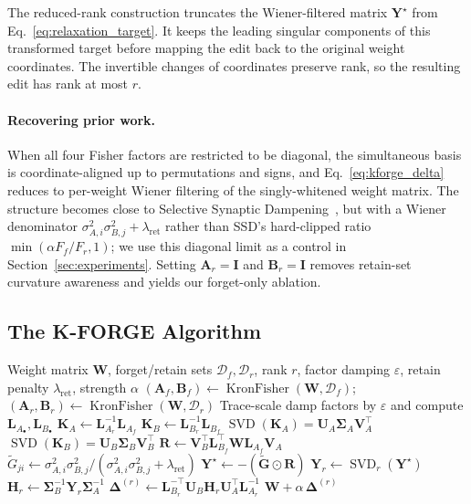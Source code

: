 \documentclass[11pt]{article}
\begin{document}
The reduced-rank construction truncates the Wiener-filtered matrix $\mathbf{Y}^{\star}$ from Eq.~\ref{eq:relaxation_target}.
It keeps the leading singular components of this transformed target before mapping the edit back to the original weight coordinates.
The invertible changes of coordinates preserve rank, so the resulting edit has rank at most $r$.


\paragraph{Recovering prior work.}
When all four Fisher factors are restricted to be diagonal, the simultaneous basis is coordinate-aligned up to permutations and signs, and Eq.~\ref{eq:kforge_delta} reduces to per-weight Wiener filtering of the singly-whitened weight matrix. The structure becomes close to Selective Synaptic Dampening~\citep{foster24}, but with a Wiener denominator $\sigma_{A,i}^2\sigma_{B,j}^2\!+\!\lambda_{\mathrm{ret}}$ rather than SSD's hard-clipped ratio $\min(\alpha F_f/F_r, 1)$; we use this diagonal limit as a control in Section~\ref{sec:experiments}. Setting $\mathbf{A}_r\!=\!\mathbf{I}$ and $\mathbf{B}_r\!=\!\mathbf{I}$ removes retain-set curvature awareness and yields our forget-only ablation.

\subsection{The K-FORGE Algorithm}
\label{sec:kforge_algorithm}
\begin{algorithm}[t]
\caption{K-FORGE}
\label{alg:kforge}
\begin{algorithmic}[1]
\Require Weight matrix $\mathbf{W}$, forget/retain sets $\mathcal{D}_f,\mathcal{D}_r$, rank $r$, factor damping $\varepsilon$, retain penalty $\lambda_{\mathrm{ret}}$, strength $\alpha$
\State $(\mathbf{A}_f,\mathbf{B}_f)\leftarrow \operatorname{KronFisher}(\mathbf{W},\mathcal{D}_f)$;\quad $(\mathbf{A}_r,\mathbf{B}_r)\leftarrow \operatorname{KronFisher}(\mathbf{W},\mathcal{D}_r)$
\State Trace-scale damp factors by $\varepsilon$ and compute $\mathbf{L}_{A_\bullet},\mathbf{L}_{B_\bullet}$
\State $\mathbf{K}_A\leftarrow\mathbf{L}_{A_r}^{-1}\mathbf{L}_{A_f}$
\State $\mathbf{K}_B\leftarrow\mathbf{L}_{B_r}^{-1}\mathbf{L}_{B_f}$
\State $\operatorname{SVD}(\mathbf{K}_A)=\mathbf{U}_A\mathbf{\Sigma}_A\mathbf{V}_A^\top$
\State $\operatorname{SVD}(\mathbf{K}_B)=\mathbf{U}_B\mathbf{\Sigma}_B\mathbf{V}_B^\top$
\State $\mathbf{R}\leftarrow \mathbf{V}_B^\top\mathbf{L}_{B_f}^\top\mathbf{W}\mathbf{L}_{A_f}\mathbf{V}_A$
\State $\widetilde{G}_{ji}\leftarrow \sigma_{A,i}^2\sigma_{B,j}^2/(\sigma_{A,i}^2\sigma_{B,j}^2+\lambda_{\mathrm{ret}})$
\State $\mathbf{Y}^\star\leftarrow -(\widetilde{\mathbf{G}}\odot \mathbf{R})$
\State $\mathbf{Y}_r\leftarrow \operatorname{SVD}_r(\mathbf{Y}^\star)$
\State $\mathbf{H}_r\leftarrow \mathbf{\Sigma}_B^{-1}\mathbf{Y}_r\mathbf{\Sigma}_A^{-1}$
\State $\mathbf{\Delta}^{(r)}\leftarrow \mathbf{L}_{B_r}^{-\top}\mathbf{U}_B\mathbf{H}_r\mathbf{U}_A^\top\mathbf{L}_{A_r}^{-1}$
\State \Return $\mathbf{W} + \alpha\,\mathbf{\Delta}^{(r)}$
\end{algorithmic}
\end{algorithm}
\end{document}
